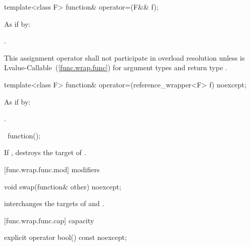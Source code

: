 %
\begin{itemdecl}
template<class F> function& operator=(F&& f);
\end{itemdecl}

\begin{itemdescr}
\pnum\effects As if by: 

\pnum\returns {}.

\pnum\remarks This assignment operator shall not participate in overload
resolution unless  is
Lvalue-Callable~(\ref{func.wrap.func}) for argument types  and
return type .
\end{itemdescr}

%
\begin{itemdecl}
template<class F> function& operator=(reference_wrapper<F> f) noexcept;
\end{itemdecl}

\begin{itemdescr}
\pnum\effects As if by: 

\pnum
\returns {}.
\end{itemdescr}

%
\begin{itemdecl}
~function();
\end{itemdecl}

\begin{itemdescr}
\pnum\effects If , destroys the target of .
\end{itemdescr}

[func.wrap.func.mod]{ modifiers}

%
\begin{itemdecl}
void swap(function& other) noexcept;
\end{itemdecl}

\begin{itemdescr}
\pnum\effects interchanges the targets of  and .
\end{itemdescr}

[func.wrap.func.cap]{ capacity}

%
\begin{itemdecl}
explicit operator bool() const noexcept;
\end{itemdecl}

